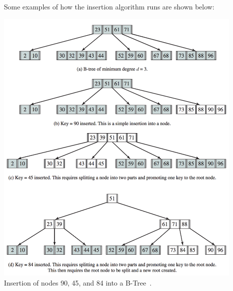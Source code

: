 Some examples of how the insertion algorithm runs are shown below:

\begin{center}
	\includegraphics[width=0.9\textwidth]{images/b-tree-insert.png}\\
	Insertion of nodes 90, 45, and 84 into a B-Tree~\cite{osi}.
\end{center}




